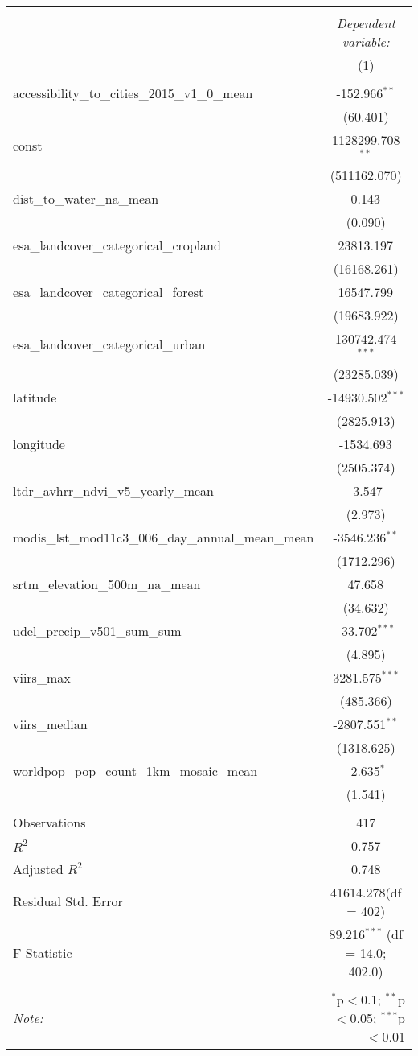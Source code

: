 \begin{table}[!htbp] \centering
\begin{tabular}{@{\extracolsep{5pt}}lc}
\\[-1.8ex]\hline
\hline \\[-1.8ex]
& \multicolumn{1}{c}{\textit{Dependent variable:}} \
\cr \cline{1-2}
\\[-1.8ex] & (1) \\
\hline \\[-1.8ex]
 accessibility_to_cities_2015_v1_0_mean & -152.966$^{**}$ \\
  & (60.401) \\
 const & 1128299.708$^{**}$ \\
  & (511162.070) \\
 dist_to_water_na_mean & 0.143$^{}$ \\
  & (0.090) \\
 esa_landcover_categorical_cropland & 23813.197$^{}$ \\
  & (16168.261) \\
 esa_landcover_categorical_forest & 16547.799$^{}$ \\
  & (19683.922) \\
 esa_landcover_categorical_urban & 130742.474$^{***}$ \\
  & (23285.039) \\
 latitude & -14930.502$^{***}$ \\
  & (2825.913) \\
 longitude & -1534.693$^{}$ \\
  & (2505.374) \\
 ltdr_avhrr_ndvi_v5_yearly_mean & -3.547$^{}$ \\
  & (2.973) \\
 modis_lst_mod11c3_006_day_annual_mean_mean & -3546.236$^{**}$ \\
  & (1712.296) \\
 srtm_elevation_500m_na_mean & 47.658$^{}$ \\
  & (34.632) \\
 udel_precip_v501_sum_sum & -33.702$^{***}$ \\
  & (4.895) \\
 viirs_max & 3281.575$^{***}$ \\
  & (485.366) \\
 viirs_median & -2807.551$^{**}$ \\
  & (1318.625) \\
 worldpop_pop_count_1km_mosaic_mean & -2.635$^{*}$ \\
  & (1.541) \\
\hline \\[-1.8ex]
 Observations & 417 \\
 $R^2$ & 0.757 \\
 Adjusted $R^2$ & 0.748 \\
 Residual Std. Error & 41614.278(df = 402)  \\
 F Statistic & 89.216$^{***}$ (df = 14.0; 402.0) \\
\hline
\hline \\[-1.8ex]
\textit{Note:} & \multicolumn{1}{r}{$^{*}$p$<$0.1; $^{**}$p$<$0.05; $^{***}$p$<$0.01} \\
\end{tabular}
\end{table}